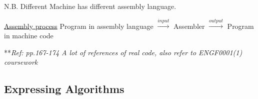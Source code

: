 \documentclass[12pt]{article}
\begin{document}
N.B. Different Machine has different assembly language.

\underline{Assembly process}\newline
Program in assembly language $\xrightarrow{input}$ Assembler $\xrightarrow{output}$ Program in machine code

**\emph{Ref: pp.167-174 A lot of references of real code, also refer to ENGF0001(1) coursework}

\subsection{Expressing Algorithms}
\end{document}
